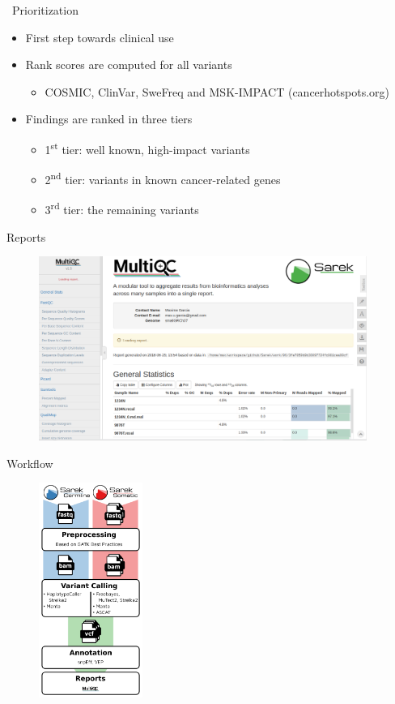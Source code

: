 \documentclass[usepdftitle=false]{beamer}
\newcommand{\ts}{\textsuperscript}
\begin{document}
\begin{frame}{\faWrench\ Prioritization}
	\begin{itemize}
		\item	First step towards clinical use
		\pause
		\item	Rank scores are computed for all variants
		\begin{itemize}
			\item	COSMIC, ClinVar, SweFreq and MSK-IMPACT (cancerhotspots.org)
		\end{itemize}
		\pause
		\item	Findings are ranked in three tiers
		\pause
		\begin{itemize}
			\item	1\ts{st} tier: well known, high-impact variants
			\item	2\ts{nd} tier: variants in known cancer-related genes
			\item	3\ts{rd} tier: the remaining variants
		\end{itemize}
	\end{itemize}
\end{frame}

\begin{frame}{Reports}
	\begin{figure}
		\includegraphics[height=6cm]{pictures/MultiQC_screenshot-2018-07-02.png}
	\end{figure}
\end{frame}

\begin{frame}{Workflow}
	\begin{figure}
		\includegraphics[height=7cm]{pictures/Sarek_workflow_3}
	\end{figure}
\end{frame}
\end{document}
